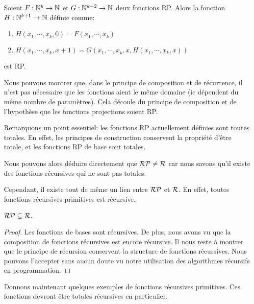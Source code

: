 \begin{definition} 
	Soient $F : \mathbb{N}^{k} \rightarrow \mathbb{N}$ et
	$G : \mathbb{N}^{k + 2} \rightarrow \mathbb{N}$ deux fonctions RP.
	Alors la fonction $H : \mathbb{N}^{k + 1} \rightarrow \mathbb{N}$ définie comme:

	\begin{enumerate}
		\item $H(x_{1}, \cdots, x_{k}, 0) = F(x_{1}, \cdots, x_{k})$
		\item $H(x_{1}, \cdots, x_{k}, x + 1) = G(x_{1}, \cdots, x_{k}, x,
			H(x_{1}, \cdots, x_{k}, x))$
	\end{enumerate}
	est RP.
\end{definition}

Nous pouvons montrer que, dans le principe de composition et de récurrence, il
n'est pas nécessaire que les fonctions aient le même domaine (ie dépendent du
même nombre de paramètres). Cela découle du principe de composition et de
l'hypothèse que les fonctions projections soient RP.

Remarquons un point essentiel: les fonctions RP actuellement définies sont
toutes totales. En effet, les principes de construction conservent la propriété
d'être totale, et les fonctions RP de base sont totales.

Nous pouvons alors déduire directement que $\mathcal{RP} \neq
\mathcal{R}$ car nous savons qu'il existe des fonctions récursives
qui ne sont pas totales.

Cependant, il existe tout de même un lien entre $\mathcal{RP}$
et $\mathcal{R}$. En effet, toutes fonctions récursives primitives
est récursive.

\begin{proposition}
	$\mathcal{RP} \subsetneq \mathcal{R}$.
\end{proposition}

\ifdefined\outputproof
\begin{proof}
	Les fonctions de bases sont récursives. De plus, nous avons vu que la
	composition de fonctions récursives est encore récursive. Il nous reste à
	montrer que le principe de récursion conservent la structure de fonctions
	récursives. Nous pouvons l'accepter sans aucun doute vu notre utilisation
	des algorithmes récursifs en programmation.
\end{proof}
\fi

Donnons maintenant quelques exemples de fonctions récursives primitives. Ces
fonctions devront être totales récursives en particulier.

